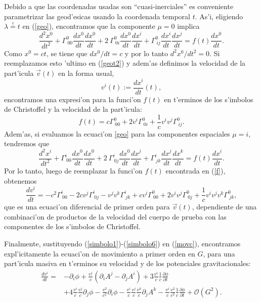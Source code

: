 Debido a que las coordenadas usadas son ``cuasi-inerciales'' es conveniente parametrizar las geod'esicas usando la coordenada temporal $t$. As'i, eligiendo $\lambda\stackrel{!}{=}t$ en (\ref{geo}), encontramos que la componente $\mu=0$ implica
\begin{equation}
\frac{d^2x^{0}}{dt^2}+\Gamma^{0}_{\ 00}\frac{dx^{0}}{dt}\frac{dx^{0}}{dt}+2\ \Gamma^{0}_{\ 0i}\frac{dx^{0}}{dt}\frac{dx^{i}}{dt}+\Gamma^{0}_{\ ij}\frac{dx^{i}}{dt}\frac{dx^{j}}{dt}=f(t)\frac{dx^{0}}{dt}.\label{geot2}
\end{equation}
Como $x^0=ct$, se tiene que $dx^0/dt=c$ y por lo tanto $d^2x^0/dt^2=0$. Si reemplazamos esto 'ultimo en (\ref{geot2}) y adem'as definimos la velocidad de la part'icula $\vec{v}(t)$ en la forma usual,
\begin{equation}
v^i(t):=\frac{dx^i}{dt}(t),
\end{equation}
encontramos una expresi'on para la funci'on $f(t)$ en t'erminos de los s'imbolos de Christoffel y la velocidad de la part'icula:
\begin{equation}
 f(t)=c\Gamma^{0}_{\ 00}+2v^i\Gamma^{0}_{\ 0i}+\frac{1}{c}v^iv^j\Gamma^{0}_{\ ij}.\label{f}
\end{equation}
Adem'as, si evaluamos la ecuaci'on \eqref{geo} para las componentes espaciales $\mu=i$, tendremos que
\begin{equation}
\frac{d^2x^{i}}{dt^2}+\Gamma^{i}_{\ 00}\frac{dx^{0}}{dt}\frac{dx^{0}}{dt}+2\ \Gamma^{i}_{\ 0j}\frac{dx^{0}}{dt}\frac{dx^{j}}{dt}+\Gamma^{i}_{\ jk}\frac{dx^{j}}{dt}\frac{dx^{k}}{dt}=f(t)\frac{dx^{i}}{dt}.\label{geoi}
\end{equation}
Por lo tanto, luego de reemplazar la funci'on $f(t)$ encontrada en (\ref{f}), obtenemos
\begin{equation}
\frac{dv^{i}}{dt}=-c^2\Gamma^{i}_{\ 00}-2cv^j\Gamma^{i}_{\ 0j}-v^jv^k\Gamma^{i}_{\ jk}+cv^i\Gamma^{0}_{\ 00}+2v^iv^j\Gamma^{0}_{\ 0j}+\frac{1}{c}v^iv^jv^k\Gamma^{0}_{\ jk},\label{movc}
\end{equation}
que es una ecuaci'on diferencial de primer orden para $\vec{v}(t)$, dependiente de una combinaci'on de productos de la velocidad del cuerpo de prueba con las componentes de los s'imbolos de Christoffel.

Finalmente, sustituyendo (\ref{simbolo1})-(\ref{simbolo6}) en (\ref{movc}), encontramos expl'icitamente la ecuaci'on de movimiento a primer orden en $G$, para una part'icula masiva en t'erminos su velocidad y de los potenciales gravitacionales:
\begin{align}
\frac{dv^{i}}{dt}={}&-\partial_i\phi+\frac{v^j}{c}(\partial_iA^{j}-\partial_jA^{i})+3\frac{v^i}{c}\frac{1}{c}\frac{\partial \phi}{\partial t}\nonumber\\
{}&+4\frac{v^i}{c}\frac{v^j}{c}\partial_j \phi-\frac{v^2}{c^2}\partial_i\phi-\frac{v^i}{c}\frac{v^j}{c}\frac{v^k}{c}\partial_j A^{k}-\frac{v^i}{c}\frac{v^2}{c^2}\frac{1}{c}\frac{\partial\phi}{\partial t}+\mathcal{O}(G^2).\label{movpot}
\end{align}

